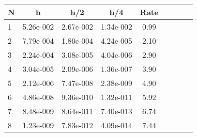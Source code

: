 \begin{tabular}{lcccccccc}
N & h & h/2 & h/4 & Rate\\
\hline
1& 5.26e-002& 2.67e-002& 1.34e-002& 0.99\\
2& 7.79e-004& 1.80e-004& 4.24e-005& 2.10\\
3& 2.24e-004& 3.08e-005& 4.04e-006& 2.90\\
4& 3.04e-005& 2.09e-006& 1.36e-007& 3.90\\
5& 2.12e-006& 7.47e-008& 2.38e-009& 4.90\\
6& 4.86e-008& 9.36e-010& 1.32e-011& 5.92\\
7& 8.48e-009& 8.64e-011& 7.40e-013& 6.74\\
8& 1.23e-009& 7.83e-012& 4.09e-014& 7.44\\
\hline
\end{tabular}
